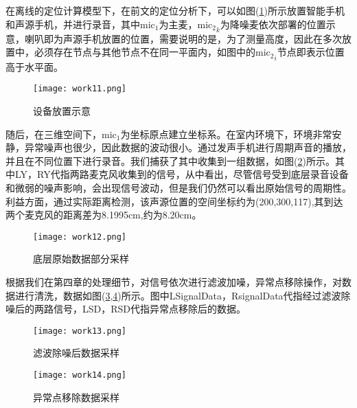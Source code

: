 \documentclass[winfonts]{njuthesis}
\begin{document}
		在离线的定位计算模型下，在前文的定位分析下，可以如图(\ref{fig: work11})所示放置智能手机和声源手机，并进行录音，其中$\text{mic}_1$为主麦，${\text{mic}_2}_k$为降噪麦依次部署的位置示意，喇叭即为声源手机放置的位置，需要说明的是，为了测量高度，因此在多次放置中，必须存在节点与其他节点不在同一平面内，如图中的${\text{mic}_2}_i$节点即表示位置高于水平面。
			
		\begin{figure}[H]
			\centering
			\texttt{[image: work11.png]}
			\caption{设备放置示意}
			\label{fig: work11}
		\end{figure}
			
		随后，在三维空间下，$\text{mic}_1$为坐标原点建立坐标系。在室内环境下，环境非常安静，异常噪声也很少，因此数据的波动很小。通过发声手机进行周期声音的播放，并且在不同位置下进行录音。我们捕获了其中收集到一组数据，如图(\ref{fig: work12})所示。其中LY，RY代指两路麦克风收集到的信号，从中看出，尽管信号受到底层录音设备和微弱的噪声影响，会出现信号波动，但是我们仍然可以看出原始信号的周期性。利益方面，通过实际距离检测，该声源位置的空间坐标约为(200,300,117),其到达两个麦克风的距离差为8.1995cm,约为8.20cm。
			
		\begin{figure}[H]
			\centering
			\texttt{[image: work12.png]}
			\caption{底层原始数据部分采样}
			\label{fig: work12}
		\end{figure}
	
		根据我们在第四章的处理细节，对信号依次进行滤波加噪，异常点移除操作，对数据进行清洗，数据如图(\ref{fig: work13},\ref{fig: work14})所示。图中LSignalData，RsignalData代指经过滤波除噪后的两路信号，LSD，RSD代指异常点移除后的数据。
		
		\begin{figure}[H]
			\centering
			\texttt{[image: work13.png]}
			\caption{滤波除噪后数据采样}
			\label{fig: work13}
		\end{figure}
	
	
		\begin{figure}[H]
			\centering
			\texttt{[image: work14.png]}
			\caption{异常点移除数据采样}
			\label{fig: work14}
		\end{figure}
\end{document}
